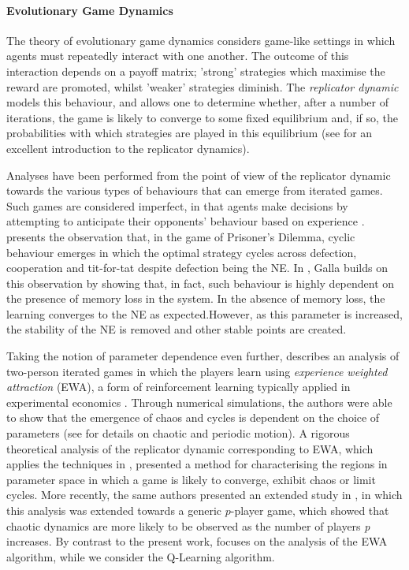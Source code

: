 \documentclass[sigconf,anonymous]{aamas}
\begin{document}
\paragraph{Evolutionary Game Dynamics}
The theory of evolutionary game dynamics \cite{Morgenstern44}
considers game-like settings in which agents must repeatedly interact
with one another. The outcome of this interaction depends on a payoff
matrix; 'strong' strategies which maximise the reward are promoted,
whilst 'weaker' strategies diminish. The \textit{replicator dynamic}
models this behaviour, and allows one to determine whether, after a
number of iterations, the game is likely to converge to some fixed
equilibrium and, if so, the probabilities with which strategies are
played in this equilibrium (see \cite{ShohamMultiagentFoundations}
for an excellent introduction to the replicator dynamics).

Analyses have been performed from the point of view of the replicator
dynamic towards the various types of behaviours that can emerge from
iterated games. Such games are considered imperfect, in that agents
make decisions by attempting to anticipate their opponents' behaviour
based on experience \cite{Galla2011}. \cite{Imhof2005} presents the
observation that, in the game of Prisoner's Dilemma, cyclic behaviour
emerges in which the optimal strategy cycles across defection,
cooperation and tit-for-tat despite defection being the
NE. In \cite{Galla2011}, Galla builds on this observation by showing that, in fact,
such behaviour is highly dependent on the presence of memory loss in
the system. In the absence of memory loss, the learning converges to
the NE as expected.However, as this parameter is increased, the
stability of the NE is removed and other stable points are created.

Taking the notion of parameter dependence even further, \cite{Galla2013}
describes an analysis of two-person iterated games in which the
players learn using \textit{experience weighted attraction} (EWA), a
form of reinforcement learning typically applied in experimental
economics \cite{Camerer2009}. Through numerical simulations, the
authors were able to show that the emergence of chaos and cycles is
dependent on the choice of parameters (see \cite{Strogatz2000} for
details on chaotic and periodic motion). A rigorous theoretical
analysis of the replicator dynamic corresponding to EWA, which applies
the techniques in \cite{Opper1992}, presented a method for
characterising the regions in parameter space in which a game is
likely to converge, exhibit chaos or limit cycles. More recently, the
same authors presented an extended study in \cite{Sanders2018}, in which
this analysis was extended towards a generic $p$-player game, which
showed that chaotic dynamics are more likely to be observed as the
number of players \textit{p} increases. By contrast to the present work, \cite{Barber2012} focuses on the analysis of the EWA algorithm, while we consider the Q-Learning \cite{Barber2012} algorithm.
\end{document}

